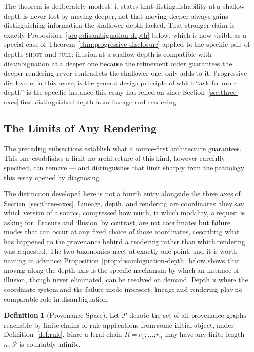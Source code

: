 \documentclass[11pt]{article}
\theoremstyle{definition}
\newtheorem{definition}[theorem]{Definition}
\begin{document}
The theorem is deliberately modest: it states that distinguishability at a shallow depth is never lost by moving deeper, not that moving deeper always gains distinguishing information the shallower depth lacked. That stronger claim is exactly Proposition~\ref{prop:disambiguation-depth} below, which is now visible as a special case of Theorem~\ref{thm:progressive-disclosure} applied to the specific pair of depths \textsc{short} and \textsc{full}: illusion at a shallow depth is compatible with disambiguation at a deeper one because the refinement order guarantees the deeper rendering never contradicts the shallower one, only adds to it. Progressive disclosure, in this sense, is the general design principle of which ``ask for more depth'' is the specific instance this essay has relied on since Section~\ref{sec:three-axes} first distinguished depth from lineage and rendering.

\subsection{The Limits of Any Rendering}

The preceding subsections establish what a source-first architecture guarantees. This one establishes a limit no architecture of this kind, however carefully specified, can remove --- and distinguishes that limit sharply from the pathology this essay opened by diagnosing.

The distinction developed here is not a fourth entry alongside the three axes of Section~\ref{sec:three-axes}. Lineage, depth, and rendering are coordinates: they say which version of a source, compressed how much, in which modality, a request is asking for. Erasure and illusion, by contrast, are not coordinates but failure modes that can occur at any fixed choice of those coordinates, describing what has happened to the provenance behind a rendering rather than which rendering was requested. The two taxonomies meet at exactly one point, and it is worth naming in advance: Proposition~\ref{prop:disambiguation-depth} below shows that moving along the depth axis is the specific mechanism by which an instance of illusion, though never eliminated, can be resolved on demand. Depth is where the coordinate system and the failure mode intersect; lineage and rendering play no comparable role in disambiguation.

\begin{definition}[Provenance Space]
\label{def:provenance-space}
Let $\mathcal{P}$ denote the set of all provenance graphs reachable by finite chains of rule applications from some initial object, under Definition~\ref{def:rule}. Since a legal chain $R = r_1; \dots; r_n$ may have any finite length $n$, $\mathcal{P}$ is countably infinite.
\end{definition}
\end{document}
